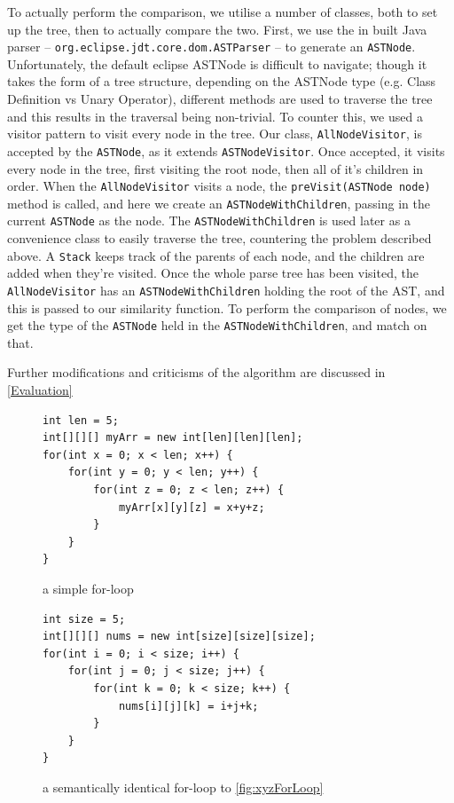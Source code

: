 To actually perform 
the comparison, we utilise a number of classes, both to set up the tree, then to actually
compare the two. First, we use the in built Java parser -- \texttt{org.eclipse.jdt.core.dom.ASTParser}
-- to generate an \texttt{ASTNode}. Unfortunately, the default eclipse ASTNode is difficult
to navigate; though it takes the form of a tree structure, depending on the ASTNode 
type (e.g. Class Definition vs Unary Operator), different methods are used to traverse
the tree and this results in the traversal being non-trivial. To counter this, we
used a visitor pattern to visit every node in the tree. Our class, \texttt{AllNodeVisitor},
is accepted by the \texttt{ASTNode}, as it extends \texttt{ASTNodeVisitor}. Once accepted, it visits
every node in the tree, first visiting the root node, then all of it's children in 
order. When the \texttt{AllNodeVisitor} visits a node, the 
\texttt{preVisit(ASTNode node)} method is called, and here we
create an \texttt{ASTNodeWithChildren}, passing in the current \texttt{ASTNode} as the node. The 
\texttt{ASTNodeWithChildren} is used later as a convenience class to easily traverse
the tree, countering the problem described above. A \texttt{Stack} keeps track
of the parents of each node, and the children are added when they're visited.
Once the whole parse tree has been visited, the \texttt{AllNodeVisitor} has an 
\texttt{ASTNodeWithChildren} holding the root of the AST, and this is passed to
our similarity function.
To perform the comparison of nodes, we get the type of the \texttt{ASTNode} held
in the \texttt{ASTNodeWithChildren}, and match on that.

Further modifications and criticisms of the algorithm are discussed in \cref{Evaluation}

\begin{figure}
\begin{minipage}[b]{0.45\linewidth}
\begin{lstlisting}
int len = 5;
int[][][] myArr = new int[len][len][len];
for(int x = 0; x < len; x++) {
	for(int y = 0; y < len; y++) {
		for(int z = 0; z < len; z++) {
			myArr[x][y][z] = x+y+z;
		}
	}
}
\end{lstlisting}
\caption{a simple for-loop}
\label{fig:xyzForLoop}
\end{minipage}
\hspace{0.5cm}
\begin{minipage}[b]{0.45\linewidth}
\begin{lstlisting}
int size = 5;
int[][][] nums = new int[size][size][size];
for(int i = 0; i < size; i++) {
	for(int j = 0; j < size; j++) {
		for(int k = 0; k < size; k++) {
			nums[i][j][k] = i+j+k;
		}
	}
}
\end{lstlisting}
\caption{a semantically identical for-loop to \ref{fig:xyzForLoop}}
\label{fig:ijkForLoop}
\end{minipage}
\end{figure}

